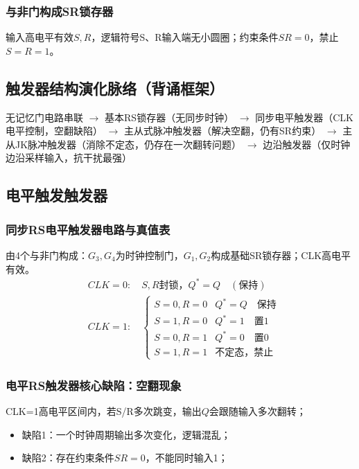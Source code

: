 \subsubsection{与非门构成SR锁存器}
输入高电平有效$S,R$，逻辑符号S、R输入端无小圆圈；约束条件$SR=0$，禁止$S=R=1$。

\subsection{触发器结构演化脉络（背诵框架）}
无记忆门电路串联 $\rightarrow$ 基本RS锁存器（无同步时钟）
$\rightarrow$ 同步电平触发器（CLK电平控制，空翻缺陷）
$\rightarrow$ 主从式脉冲触发器（解决空翻，仍有SR约束）
$\rightarrow$ 主从JK脉冲触发器（消除不定态，仍存在一次翻转问题）
$\rightarrow$ 边沿触发器（仅时钟边沿采样输入，抗干扰最强）

\subsection{电平触发触发器}
\subsubsection{同步RS电平触发器电路与真值表}
由4个与非门构成：$G_3,G_4$为时钟控制门，$G_1,G_2$构成基础SR锁存器；CLK高电平有效。
\[
\begin{aligned}
&CLK=0:\quad S,R\text{封锁，}Q^*=Q \quad (\text{保持})\\
&CLK=1:\quad
\begin{cases}
S=0,R=0 & Q^*=Q \quad \text{保持}\\
S=1,R=0 & Q^*=1 \quad \text{置1}\\
S=0,R=1 & Q^*=0 \quad \text{置0}\\
S=1,R=1 & \text{不定态，禁止}
\end{cases}
\end{aligned}
\]

\subsubsection{电平RS触发器核心缺陷：空翻现象}
CLK=1高电平区间内，若S/R多次跳变，输出$Q$会跟随输入多次翻转；
\begin{itemize}
    \item 缺陷1：一个时钟周期输出多次变化，逻辑混乱；
    \item 缺陷2：存在约束条件$SR=0$，不能同时输入1；
\end{itemize}

